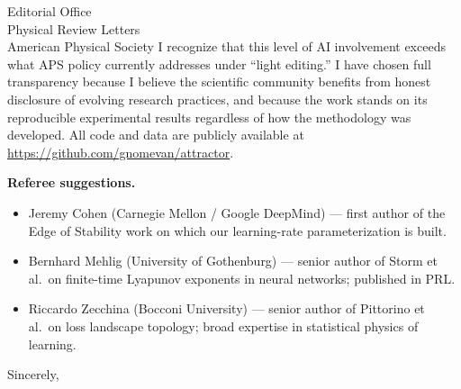 \documentclass[11pt]{letter}
\begin{document}
\begin{letter}{%
Editorial Office\\
Physical Review Letters\\
American Physical Society}
I recognize that this level of AI involvement exceeds what APS policy currently addresses under ``light editing.'' I have chosen full transparency because I believe the scientific community benefits from honest disclosure of evolving research practices, and because the work stands on its reproducible experimental results regardless of how the methodology was developed. All code and data are publicly available at \url{https://github.com/gnomevan/attractor}.

\textbf{Referee suggestions.}
\begin{itemize}
\item Jeremy Cohen (Carnegie Mellon / Google DeepMind) --- first author of the Edge of Stability work on which our learning-rate parameterization is built.
\item Bernhard Mehlig (University of Gothenburg) --- senior author of Storm et al.\ on finite-time Lyapunov exponents in neural networks; published in PRL.
\item Riccardo Zecchina (Bocconi University) --- senior author of Pittorino et al.\ on loss landscape topology; broad expertise in statistical physics of learning.
\end{itemize}

\closing{Sincerely,}

\end{letter}
\end{document}
